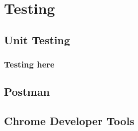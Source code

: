 \chapter{Testing}
\label{chap:testing}

\section{Unit Testing}
\label{testing:unit}

\subsection{Testing here}
\label{unit:1}

\section{Postman}
\label{testing:postman}

\section{Chrome Developer Tools}
\label{testing:chrome-dev}
